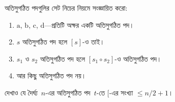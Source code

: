 \documentclass[../../../include/open-logic-section]{subfiles}
\begin{document}
\begin{prob}
  অতিসুগঠিত পদগুলির সেট নিচের নিয়মে সংজ্ঞায়িত করো:
  \begin{enumerate}
  \item $\mathrm{a}$, $\mathrm{b}$, $\mathrm{c}$,
    $\mathrm{d}$—প্রতিটি অক্ষর একটি অতিসুগঠিত পদ।
  \item $s$ অতিসুগঠিত পদ হলে $[s]$-ও তাই।
  \item $s_1$ ও $s_2$ অতিসুগঠিত পদ হলে
    $[s_1 \circ s_2]$-ও অতিসুগঠিত পদ।
  \item আর কিছু অতিসুগঠিত পদ নয়।
  \end{enumerate}
  দেখাও যে দৈর্ঘ্য~$n$-এর অতিসুগঠিত পদ~$t$-তে
  $[$-এর সংখ্যা $\le n/2 +1$।
\end{prob}
\end{document}
